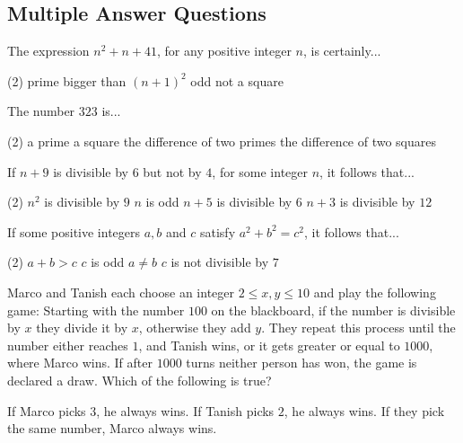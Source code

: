 \documentclass{article}
\begin{document}
\subsection{Multiple Answer Questions}
\begin{problem}
The expression $n^2+n+41$, for any positive integer $n$, is certainly...
\begin{tasks2}(2)
\task prime
\task bigger than $(n+1)^2$
\task odd
\task not a square
\end{tasks2}
\end{problem}

\begin{problem}
The number $323$ is...
\begin{tasks2}(2)
\task a prime
\task a square
\task the difference of two primes
\task the difference of two squares
\end{tasks2}
\end{problem}

\begin{problem}
If $n+9$ is divisible by $6$ but not by $4$, for some integer $n$, it follows that...
\begin{tasks2}(2)
\task $n^2$ is divisible by $9$
\task $n$ is odd
\task $n+5$ is divisible by $6$
\task $n+3$ is divisible by $12$
\end{tasks2}
\end{problem}

\begin{problem}
If some positive integers $a,b$ and $c$ satisfy $a^2+b^2 = c^2$, it follows that...
\begin{tasks2}(2)
\task $a+b > c$
\task $c$ is odd
\task $a \neq b$
\task $c$ is not divisible by $7$
\end{tasks2}
\end{problem}

\begin{problem}
Marco and Tanish each choose an integer $2 \leq x, y \leq 10$ and play the following game: Starting with the number $100$ on the blackboard, if the number is divisible by $x$ they divide it by $x$, otherwise they add $y$. They repeat this process until the number either reaches $1$, and Tanish wins, or it gets greater or equal to $1000$, where Marco wins. If after $1000$ turns neither person has won, the game is declared a draw. Which of the following is true?

\begin{tasks}
\task If Marco picks $3$, he always wins.
\task If Tanish picks $2$, he always wins.
\task
\task
\task 
\task If they pick the same number, Marco always wins.
\end{tasks}
\end{problem}
\end{document}
